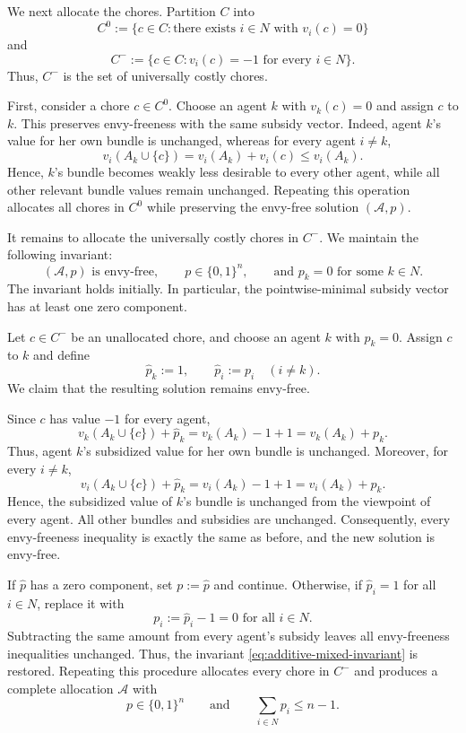 \documentclass[11pt]{article}
\makeatletter
\theoremstyle{plain}
\theoremstyle{plain}
\renewenvironment{proof}[1][\proofname]{\par
  \pushQED{\qed}%
  \normalfont \topsep6\p@\@plus6\p@\relax
  \trivlist
  \item[\hskip\labelsep\bfseries #1\@addpunct{}]\ignorespaces
}{%
  \popQED\endtrivlist\@endpefalse
}
\newcommand{\alloc}{\mathcal{A}}              %
\makeatother
\begin{document}
\begin{proof}
We next allocate the chores. Partition $C$ into
\[
C^0:=\{c\in C:\text{there exists }i\in N\text{ with }v_i(c)=0\}
\]
and
\[
C^-:=\{c\in C:v_i(c)=-1\text{ for every }i\in N\}.
\]
Thus, $C^-$ is the set of universally costly chores.

First, consider a chore $c\in C^0$. Choose an agent $k$ with $v_k(c)=0$ and assign $c$ to $k$. This preserves envy-freeness with the same subsidy vector. Indeed, agent $k$'s value for her own bundle is unchanged, whereas for every agent $i\neq k$,
\[
v_i(A_k\cup\{c\})
=
v_i(A_k)+v_i(c)
\leq v_i(A_k).
\]
Hence, $k$'s bundle becomes weakly less desirable to every other agent, while all other relevant bundle values remain unchanged. Repeating this operation allocates all chores in $C^0$ while preserving the envy-free solution $(\alloc,p)$.

It remains to allocate the universally costly chores in $C^-$. We maintain the following invariant:
\begin{equation}\label{eq:additive-mixed-invariant}
(\alloc,p)\text{ is envy-free},\qquad
p\in\{0,1\}^n,
\qquad
\text{and }p_k=0\text{ for some }k\in N.
\end{equation}
The invariant holds initially. In particular, the pointwise-minimal subsidy vector has at least one zero component.

Let $c\in C^-$ be an unallocated chore, and choose an agent $k$ with
$p_k=0$. Assign $c$ to $k$ and define
\[
\widehat p_k:=1,
\qquad
\widehat p_i:=p_i\quad(i\neq k).
\]
We claim that the resulting solution remains envy-free.

Since $c$ has value $-1$ for every agent,
\[
v_k(A_k\cup\{c\})+\widehat p_k
=
v_k(A_k)-1+1
=
v_k(A_k)+p_k.
\]
Thus, agent $k$'s subsidized value for her own bundle is unchanged. Moreover, for every $i\neq k$,
\[
v_i(A_k\cup\{c\})+\widehat p_k
=
v_i(A_k)-1+1
=
v_i(A_k)+p_k.
\]
Hence, the subsidized value of $k$'s bundle is unchanged from the viewpoint of every agent. All other bundles and subsidies are unchanged. Consequently, every envy-freeness inequality is exactly the same as before, and the new solution is envy-free.

If $\widehat p$ has a zero component, set $p:=\widehat p$ and continue. Otherwise, if $\widehat p_i=1$ for all $i\in N$, replace it with
\[
p_i:=\widehat p_i-1=0 \text{ for all } i\in N.
\]
Subtracting the same amount from every agent's subsidy leaves all envy-freeness inequalities unchanged. Thus, the invariant \eqref{eq:additive-mixed-invariant} is restored. Repeating this procedure allocates every chore in $C^-$ and produces a complete allocation $\alloc$ with
\[
p\in\{0,1\}^n
\qquad\text{and}\qquad
\sum_{i\in N}p_i\leq n-1.
\]


\end{proof}
\end{document}
